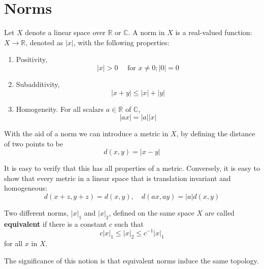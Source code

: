 \documentclass[12pt, oneside]{book}
\begin{document}
\section{Norms}
\begin{definition}
    Let $X$ denote a linear space over $\mathbb{R}$ or $\mathbb{C}$. A norm in $X$ is a real-valued function: $X \rightarrow \mathbb{R}$, denoted as $|x|$, with the following properties:

    \begin{enumerate}[label=(\roman*)]
        \item Positivity,
              \begin{equation*}
                  |x|>0 \quad \text { for } x \neq 0 ;|0|=0
              \end{equation*}

        \item Subadditivity,
              \begin{equation*}
                  |x+y| \leq|x|+|y|
              \end{equation*}

        \item Homogeneity. For all scalars $a\in \mathbb{R}$ of $\mathbb{C}$,
              \begin{equation*}
                  |a x|=|a||x|
              \end{equation*}
    \end{enumerate}
    With the aid of a norm we can introduce a metric in $X$, by defining the distance of two points to be
    \begin{equation*}
        d(x, y)=|x-y|
    \end{equation*}

    It is easy to verify that this has all properties of a metric. Conversely, it is easy to show that every metric in a linear space that is translation invariant and homogeneous:
    \begin{equation*}
        d(x+z, y+z)=d(x, y), \quad d(a x, a y)=|a| d(x, y)
    \end{equation*}
\end{definition}

\begin{definition}
    Two different norms, $|x|_1$ and $|x|_2$, defined on the same space $X$ are called \textbf{equivalent} if there is a constant $c$ such that
    \begin{equation*}
        c|x|_1 \leq|x|_2 \leq c^{-1}|x|_1
    \end{equation*}
    for all $x$ in $X$.

    The significance of this notion is that equivalent norms induce the same topology.
\end{definition}
\end{document}
